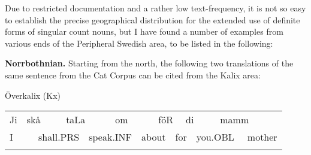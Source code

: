 \begin{styleBodyTextFirst}
Due to restricted documentation and a rather low text-frequency, it is not so easy to establish the precise geographical distribution for the extended use of definite forms of singular count nouns, but I have found a number of examples from various ends of the Peripheral Swedish area, to be listed in the following: 

\end{styleBodyTextFirst}

\begin{styleBodytextC}
\textbf{Norrbothnian.} Starting from the north, the following two translations of the same sentence from the Cat Corpus can be cited from the Kalix area:

\end{styleBodytextC}

\begin{listWWNumileveli}
\item 

\end{listWWNumileveli}

\begin{listWWNumxlivleveli}
\item 

\begin{styleExLtrTbl}
Överkalix (Kx)

\end{styleExLtrTbl}

\end{listWWNumxlivleveli}

\begin{tabular}{llllllllllllll}
\lsptoprule
Ji & \multicolumn{2}{l}{skå

} & \multicolumn{2}{l}{taLa

} & \multicolumn{2}{l}{om

} & \multicolumn{2}{l}{föR

} & \multicolumn{2}{l}{di

} & \multicolumn{2}{l}{mamm

} & \\
\multicolumn{2}{l}{I

} & \multicolumn{2}{l}{shall.PRS

} & \multicolumn{2}{l}{speak.INF

} & \multicolumn{2}{l}{about

} & \multicolumn{2}{l}{for

} & \multicolumn{2}{l}{you.OBL

} & \multicolumn{2}{l}{mother

}\\
\lspbottomrule
\end{tabular}

